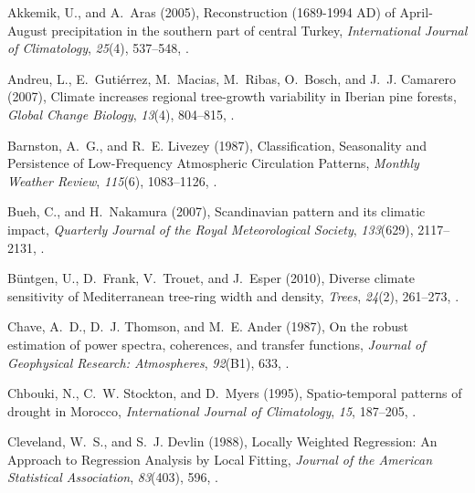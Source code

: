 \documentclass[draft,jgr]{AGUTeX}
\begin{document}
\begin{article}
\begin{thebibliography}{74}
Akkemik, U., and A.~Aras (2005), {Reconstruction (1689-1994 AD) of April-August
  precipitation in the southern part of central Turkey}, \textit{International
  Journal of Climatology}, \textit{25}(4), 537--548, .

Andreu, L., E.~Guti{\'e}rrez, M.~Macias, M.~Ribas, O.~Bosch, and J.~J. Camarero
  (2007), {Climate increases regional tree-growth variability in Iberian pine
  forests}, \textit{Global Change Biology}, \textit{13}(4), 804--815, .

Barnston, A.~G., and R.~E. Livezey (1987), {Classification, Seasonality and
  Persistence of Low-Frequency Atmospheric Circulation Patterns},
  \textit{Monthly Weather Review}, \textit{115}(6), 1083--1126,
  .

Bueh, C., and H.~Nakamura (2007), Scandinavian pattern and its climatic impact,
  \textit{Quarterly Journal of the Royal Meteorological Society},
  \textit{133}(629), 2117--2131, .

B{\"u}ntgen, U., D.~Frank, V.~Trouet, and J.~Esper (2010), {Diverse climate
  sensitivity of Mediterranean tree-ring width and density}, \textit{Trees},
  \textit{24}(2), 261--273, .

Chave, A.~D., D.~J. Thomson, and M.~E. Ander (1987), {On the robust estimation
  of power spectra, coherences, and transfer functions}, \textit{Journal of
  Geophysical Research: Atmospheres}, \textit{92}(B1), 633,
  .

Chbouki, N., C.~W. Stockton, and D.~Myers (1995), {Spatio-temporal patterns of
  drought in {Morocco}}, \textit{International Journal of Climatology},
  \textit{15}, 187--205, .

Cleveland, W.~S., and S.~J. Devlin (1988), {Locally Weighted Regression: An
  Approach to Regression Analysis by Local Fitting}, \textit{Journal of the
  American Statistical Association}, \textit{83}(403), 596,
  .


\end{thebibliography}
\end{article}
\end{document}
